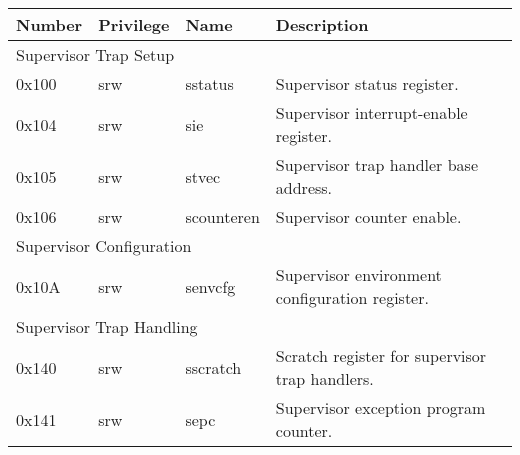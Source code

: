 \begin{table}[!ht]
  \centering
  \begin{tabular}{|llll|}
  \hline
  \multicolumn{1}{|l|}{\textbf{Number}} & \multicolumn{1}{l|}{\textbf{Privilege}} & \multicolumn{1}{l|}{\textbf{Name}} & \textbf{Description}                           \\ \hline
  \multicolumn{4}{|l|}{Supervisor Trap Setup}                                                                                                                           \\ \hline
  \multicolumn{1}{|l|}{0x100}           & \multicolumn{1}{l|}{\acrshort{srw}}                & \multicolumn{1}{l|}{sstatus}       & Supervisor status register.                    \\ \hline
  \multicolumn{1}{|l|}{0x104}           & \multicolumn{1}{l|}{\acrshort{srw}}                & \multicolumn{1}{l|}{sie}           & Supervisor interrupt-enable register.          \\ \hline
  \multicolumn{1}{|l|}{0x105}           & \multicolumn{1}{l|}{\acrshort{srw}}                & \multicolumn{1}{l|}{stvec}         & Supervisor trap handler base address.          \\ \hline
  \multicolumn{1}{|l|}{0x106}           & \multicolumn{1}{l|}{\acrshort{srw}}                & \multicolumn{1}{l|}{scounteren}    & Supervisor counter enable.                     \\ \hline
  \multicolumn{4}{|l|}{Supervisor Configuration}                                                                                                                        \\ \hline
  \multicolumn{1}{|l|}{0x10A}           & \multicolumn{1}{l|}{\acrshort{srw}}                & \multicolumn{1}{l|}{senvcfg}       & Supervisor environment configuration register. \\ \hline
  \multicolumn{4}{|l|}{Supervisor Trap Handling}                                                                                                                        \\ \hline
  \multicolumn{1}{|l|}{0x140}           & \multicolumn{1}{l|}{\acrshort{srw}}                & \multicolumn{1}{l|}{sscratch}      & Scratch register for supervisor trap handlers. \\ \hline
  \multicolumn{1}{|l|}{0x141}           & \multicolumn{1}{l|}{\acrshort{srw}}                & \multicolumn{1}{l|}{sepc}          & Supervisor exception program counter.          \\ \hline

\end{tabular}
\end{table}

